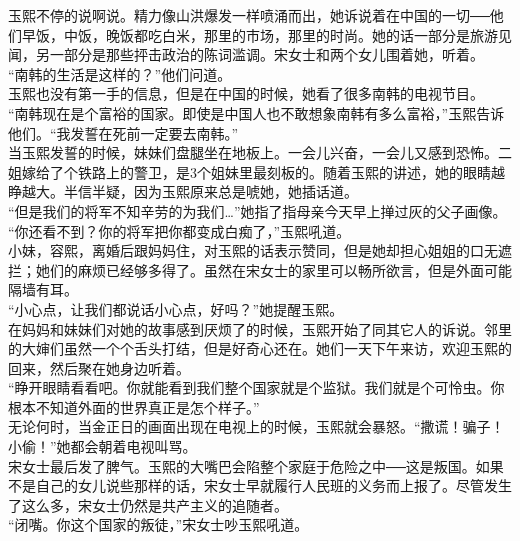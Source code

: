 玉熙不停的说啊说。精力像山洪爆发一样喷涌而出，她诉说着在中国的一切──他们早饭，中饭，晚饭都吃白米，那里的市场，那里的时尚。她的话一部分是旅游见闻，另一部分是那些抨击政治的陈词滥调。宋女士和两个女儿围着她，听着。\\

“南韩的生活是这样的？”他们问道。\\

玉熙也没有第一手的信息，但是在中国的时候，她看了很多南韩的电视节目。\\

“南韩现在是个富裕的国家。即使是中国人也不敢想象南韩有多么富裕，”玉熙告诉他们。“我发誓在死前一定要去南韩。”\\

当玉熙发誓的时候，妹妹们盘腿坐在地板上。一会儿兴奋，一会儿又感到恐怖。二姐嫁给了个铁路上的警卫，是3个姐妹里最刻板的。随着玉熙的讲述，她的眼睛越睁越大。半信半疑，因为玉熙原来总是唬她，她插话道。\\

“但是我们的将军不知辛劳的为我们…”她指了指母亲今天早上掸过灰的父子画像。\\

“你还看不到？你的将军把你都变成白痴了，”玉熙吼道。\\

小妹，容熙，离婚后跟妈妈住，对玉熙的话表示赞同，但是她却担心姐姐的口无遮拦；她们的麻烦已经够多得了。虽然在宋女士的家里可以畅所欲言，但是外面可能隔墙有耳。\\

“小心点，让我们都说话小心点，好吗？”她提醒玉熙。\\

在妈妈和妹妹们对她的故事感到厌烦了的时候，玉熙开始了同其它人的诉说。邻里的大婶们虽然一个个舌头打结，但是好奇心还在。她们一天下午来访，欢迎玉熙的回来，然后聚在她身边听着。\\

“睁开眼睛看看吧。你就能看到我们整个国家就是个监狱。我们就是个可怜虫。你根本不知道外面的世界真正是怎个样子。”\\

无论何时，当金正日的画面出现在电视上的时候，玉熙就会暴怒。“撒谎！骗子！小偷！”她都会朝着电视叫骂。\\

宋女士最后发了脾气。玉熙的大嘴巴会陷整个家庭于危险之中──这是叛国。如果不是自己的女儿说些那样的话，宋女士早就履行人民班的义务而上报了。尽管发生了这么多，宋女士仍然是共产主义的追随者。\\

“闭嘴。你这个国家的叛徒，”宋女士吵玉熙吼道。\\

